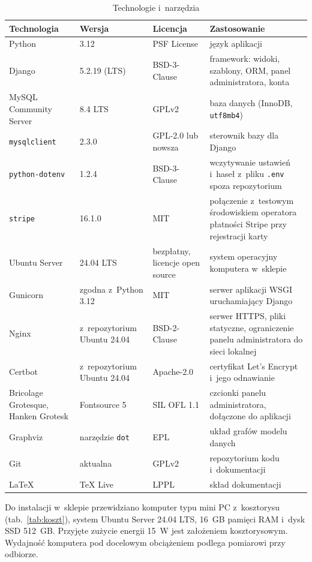 \documentclass[12pt,a4paper,oneside]{article}
\newcounter{pu}
\begin{document}
\begin{table}[H]
	\centering
	\caption{Technologie i~narzędzia}
	\label{tab:technologie}
	\small
	\begin{tabularx}{\textwidth}{@{}L{4.4cm}L{2.6cm}L{2.8cm}>{\raggedright\arraybackslash}X@{}}
		\toprule
		Technologia & Wersja & Licencja & Zastosowanie \\
		\midrule
		Python & 3.12 & PSF License & język aplikacji \\
		Django & 5.2.19 (LTS) & BSD-3-Clause & framework: widoki, szablony, ORM, panel administratora, konta \\
		MySQL Community Server & 8.4 LTS & GPLv2 & baza danych (InnoDB, \texttt{utf8mb4}) \\
		\texttt{mysqlclient} & 2.3.0 & GPL-2.0 lub nowsza & sterownik bazy dla Django \\
		\texttt{python-dotenv} & 1.2.4 & BSD-3-Clause & wczytywanie ustawień i~haseł z~pliku \texttt{.env} spoza repozytorium \\
		\texttt{stripe} & 16.1.0 & MIT & połączenie z~testowym środowiskiem operatora płatności Stripe przy rejestracji karty \\
		Ubuntu Server & 24.04 LTS & bezpłatny, licencje open source & system operacyjny komputera w~sklepie \\
		Gunicorn & zgodna z~Python 3.12 & MIT & serwer aplikacji WSGI uruchamiający Django \\
		Nginx & z~repozytorium Ubuntu 24.04 & BSD-2-Clause & serwer HTTPS, pliki statyczne, ograniczenie panelu administratora do sieci lokalnej \\
		Certbot & z~repozytorium Ubuntu 24.04 & Apache-2.0 & certyfikat Let's Encrypt i~jego odnawianie \\
		Bricolage Grotesque, Hanken Grotesk & Fontsource 5 & SIL OFL 1.1 & czcionki panelu administratora, dołączone do aplikacji \\
		Graphviz & narzędzie \texttt{dot} & EPL & układ grafów modelu danych \\
		Git & aktualna & GPLv2 & repozytorium kodu i~dokumentacji \\
		LaTeX & TeX Live & LPPL & skład dokumentacji \\
		\bottomrule
	\end{tabularx}
\end{table}

Do instalacji w~sklepie przewidziano komputer typu mini PC z~kosztorysu (tab.~\ref{tab:koszt}), system Ubuntu Server 24.04 LTS, 16~GB pamięci RAM i~dysk SSD 512~GB. Przyjęte zużycie energii 15~W jest założeniem kosztorysowym. Wydajność komputera pod docelowym obciążeniem podlega pomiarowi przy odbiorze.
\end{document}

